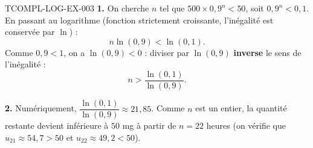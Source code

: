 \begin{corrige}{TCOMPL-LOG-EX-003}
\textbf{1.} On cherche $n$ tel que $500 \times 0{,}9^n < 50$, soit $0{,}9^n < 0{,}1$. En passant au logarithme (fonction strictement croissante, l'inégalité est conservée par $\ln$) :
\[
  n \ln(0{,}9) < \ln(0{,}1).
\]
Comme $0{,}9<1$, on a $\ln(0{,}9)<0$ : diviser par $\ln(0{,}9)$ \textbf{inverse} le sens de l'inégalité :
\[
  n > \frac{\ln(0{,}1)}{\ln(0{,}9)}.
\]

\textbf{2.} Numériquement, $\dfrac{\ln(0{,}1)}{\ln(0{,}9)} \approx 21{,}85$. Comme $n$ est un entier, la quantité restante devient inférieure à $50$ mg à partir de $n=22$ heures (on vérifie que $u_{21}\approx54{,}7 > 50$ et $u_{22}\approx49{,}2<50$).
\end{corrige}
